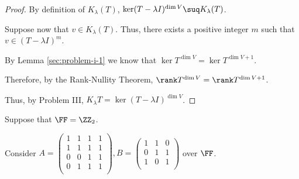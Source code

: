 \documentclass[11pt]{scrartcl}
\begin{document}
\begin{proof}
  \hfill

  By definition of $K_{\lambda}(T)$, $\ker(T-\lambda I)^{\dim V}\suq K_{\lambda}(T)$.

  Suppose now that $v\in K_{\lambda}(T)$. Thus, there exists a positive integer $m$ such that $v \in (T-\lambda I)^{m}$. 



  By Lemma \ref{sec:problem-i-1} we know that $\ker T^{\dim V}=\ker T^{\dim V+1}$.

  Therefore, by the Rank-Nullity Theorem,
  $\rank T^{\dim V} = \rank T^{\dim V+1}$.

  Thus, by Problem III,
  $K_{\lambda}T = \ker(T-\lambda I)^{\dim V}$.
\end{proof}
Suppose that $\FF = \ZZ_2$.

Consider $A = \left(
  \begin{matrix}
    1 & 1 & 1 & 1 \\
    1 & 1 & 1 & 1 \\
    0 & 0 & 1 & 1 \\
    0 & 1 & 1 & 1 \\
  \end{matrix}
\right), B = \left(
  \begin{matrix}
    1 & 1 & 0 \\
    0 & 1 & 1 \\
    1 & 0 & 1 \\
  \end{matrix}
\right)$ over $\FF$.
\end{document}

